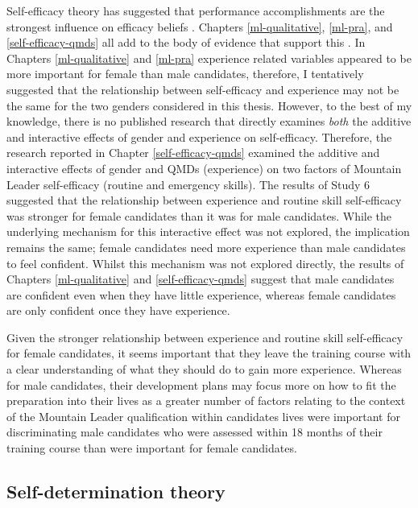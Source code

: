\documentclass[
  12pt,
  a4paper,
]{book}
\begin{document}
Self-efficacy theory has suggested that performance accomplishments are the strongest influence on efficacy beliefs \citep{Bandura1982}. Chapters \ref{ml-qualitative}, \ref{ml-pra}, and \ref{self-efficacy-qmds} all add to the body of evidence that support this \citep[e.g.,][]{Anstiss2018, Chase2003, Samson2014, Shipherd2019}. In Chapters \ref{ml-qualitative} and \ref{ml-pra} experience related variables appeared to be more important for female than male candidates, therefore, I tentatively suggested that the relationship between self-efficacy and experience may not be the same for the two genders considered in this thesis. However, to the best of my knowledge, there is no published research that directly examines \emph{both} the additive and interactive effects of gender and experience on self-efficacy. Therefore, the research reported in Chapter \ref{self-efficacy-qmds} examined the additive and interactive effects of gender and QMDs (experience) on two factors of Mountain Leader self-efficacy (routine and emergency skills). The results of Study 6 suggested that the relationship between experience and routine skill self-efficacy was stronger for female candidates than it was for male candidates. While the underlying mechanism for this interactive effect was not explored, the implication remains the same; female candidates need more experience than male candidates to feel confident. Whilst this mechanism was not explored directly, the results of Chapters \ref{ml-qualitative} and \ref{self-efficacy-qmds} suggest that male candidates are confident even when they have little experience, whereas female candidates are only confident once they have experience.

Given the stronger relationship between experience and routine skill self-efficacy for female candidates, it seems important that they leave the training course with a clear understanding of what they should do to gain more experience. Whereas for male candidates, their development plans may focus more on how to fit the preparation into their lives as a greater number of factors relating to the context of the Mountain Leader qualification within candidates lives were important for discriminating male candidates who were assessed within 18 months of their training course than were important for female candidates.

\hypertarget{self-determination-theory}{%
\subsection{Self-determination theory}\label{self-determination-theory}}
\end{document}
